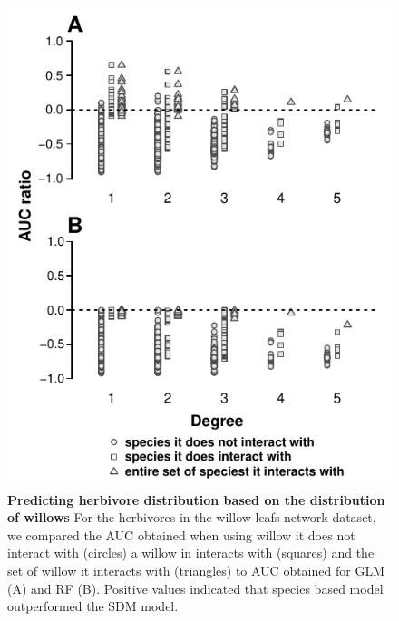 \begin{figure}
\centering
\includegraphics{chapitre3/figS9.pdf}
\caption{\textbf{Predicting herbivore distribution based on the
distribution of willows} For the herbivores in the willow leafs network
dataset, we compared the AUC obtained when using willow it does not
interact with (circles) a willow in interacts with (squares) and the set
of willow it interacts with (triangles) to AUC obtained for GLM (A) and
RF (B). Positive values indicated that species based model outperformed
the SDM model.\label{fig:ratauc}}
\end{figure}
